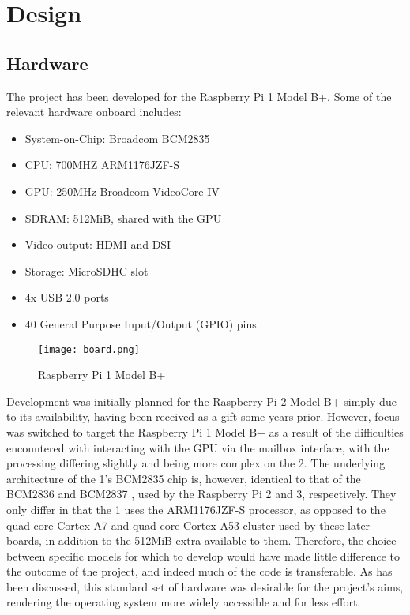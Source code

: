 \section{Design}

\subsection{Hardware}
    The project has been developed for the Raspberry Pi 1 Model B+.
    Some of the relevant hardware onboard includes:
    \begin{itemize}
        \itemsep0em
        \item System-on-Chip: Broadcom BCM2835
        \item CPU: 700MHZ ARM1176JZF-S
        \item GPU: 250MHz Broadcom VideoCore IV
        \item SDRAM: 512MiB, shared with the GPU
        \item Video output: HDMI and DSI
        \item Storage: MicroSDHC slot
        \item 4x USB 2.0 ports
        \item 40 General Purpose Input/Output (GPIO) pins
    \end{itemize}

    \begin{figure}[h]
        \centering
        \texttt{[image: board.png]}
        \caption{Raspberry Pi 1 Model B+}
    \end{figure}

    Development was initially planned for the Raspberry Pi 2 Model B+ simply due
    to its availability, having been received as a gift some years prior.
    However, focus was switched to target the Raspberry Pi 1 Model B+ as a
    result of the difficulties encountered with interacting with the GPU via the
    mailbox interface, with the processing differing slightly and being more
    complex on the 2. The underlying architecture of the 1's BCM2835 chip is,
    however, identical to that of the BCM2836 and BCM2837
    \cite{IdenticalArchitecture}, used by the Raspberry Pi 2 and 3,
    respectively. They only differ in that the 1 uses the ARM1176JZF-S
    processor, as opposed to the quad-core Cortex-A7 and quad-core Cortex-A53
    cluster used by these later boards, in addition to the 512MiB extra
    available to them. Therefore, the choice between specific models for which
    to develop would have made little difference to the outcome of the project,
    and indeed much of the code is transferable. As has been discussed, this
    standard set of hardware was desirable for the project's aims, rendering the
    operating system more widely accessible and for less effort.

